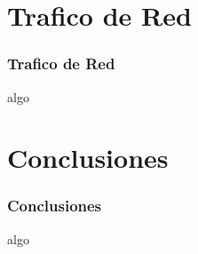 \section{Trafico de Red}
  \begin{frame}
    \frametitle{Trafico de Red}
    algo
  \end{frame}
\section{Conclusiones}
  \begin{frame}
    \frametitle{Conclusiones}
    algo
  \end{frame}
